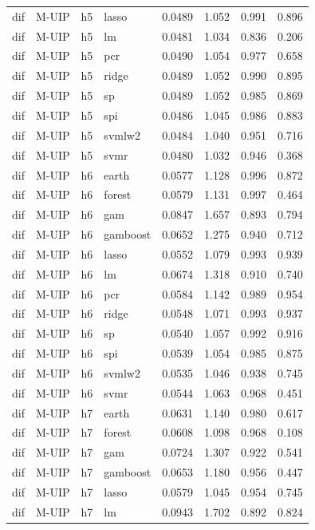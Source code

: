 \begin{ThreePartTable}
\begin{longtable}[t]{llclcccc}
dif & M-UIP & h5 & lasso & 0.0489 & 1.052 & 0.991 & 0.896\\
dif & M-UIP & h5 & lm & 0.0481 & 1.034 & 0.836 & 0.206\\
dif & M-UIP & h5 & pcr & 0.0490 & 1.054 & 0.977 & 0.658\\
dif & M-UIP & h5 & ridge & 0.0489 & 1.052 & 0.990 & 0.895\\
dif & M-UIP & h5 & sp & 0.0489 & 1.052 & 0.985 & 0.869\\
dif & M-UIP & h5 & spi & 0.0486 & 1.045 & 0.986 & 0.883\\
dif & M-UIP & h5 & svmlw2 & 0.0484 & 1.040 & 0.951 & 0.716\\
dif & M-UIP & h5 & svmr & 0.0480 & 1.032 & 0.946 & 0.368\\
\addlinespace
dif & M-UIP & h6 & earth & 0.0577 & 1.128 & 0.996 & 0.872\\
dif & M-UIP & h6 & forest & 0.0579 & 1.131 & 0.997 & 0.464\\
dif & M-UIP & h6 & gam & 0.0847 & 1.657 & 0.893 & 0.794\\
dif & M-UIP & h6 & gamboost & 0.0652 & 1.275 & 0.940 & 0.712\\
dif & M-UIP & h6 & lasso & 0.0552 & 1.079 & 0.993 & 0.939\\
dif & M-UIP & h6 & lm & 0.0674 & 1.318 & 0.910 & 0.740\\
dif & M-UIP & h6 & pcr & 0.0584 & 1.142 & 0.989 & 0.954\\
dif & M-UIP & h6 & ridge & 0.0548 & 1.071 & 0.993 & 0.937\\
dif & M-UIP & h6 & sp & 0.0540 & 1.057 & 0.992 & 0.916\\
dif & M-UIP & h6 & spi & 0.0539 & 1.054 & 0.985 & 0.875\\
dif & M-UIP & h6 & svmlw2 & 0.0535 & 1.046 & 0.938 & 0.745\\
dif & M-UIP & h6 & svmr & 0.0544 & 1.063 & 0.968 & 0.451\\
\addlinespace
dif & M-UIP & h7 & earth & 0.0631 & 1.140 & 0.980 & 0.617\\
dif & M-UIP & h7 & forest & 0.0608 & 1.098 & 0.968 & 0.108\\
dif & M-UIP & h7 & gam & 0.0724 & 1.307 & 0.922 & 0.541\\
dif & M-UIP & h7 & gamboost & 0.0653 & 1.180 & 0.956 & 0.447\\
dif & M-UIP & h7 & lasso & 0.0579 & 1.045 & 0.954 & 0.745\\
dif & M-UIP & h7 & lm & 0.0943 & 1.702 & 0.892 & 0.824\\

\end{longtable}
\end{ThreePartTable}
